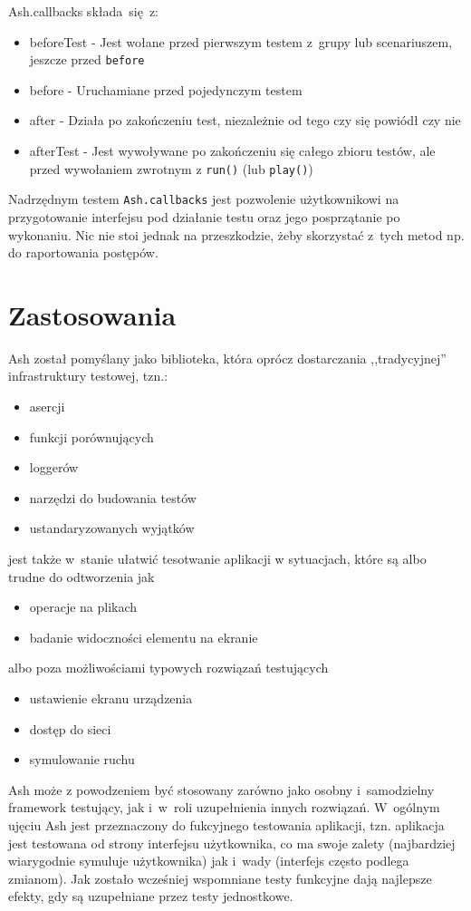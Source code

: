 \documentclass[brudnopis]{xmgr}
\begin{document}
Ash.callbacks składa~się~z:

\begin{itemize}
  \item beforeTest - Jest wołane przed pierwszym testem z~grupy lub scenariuszem, jeszcze przed \texttt{before}
  \item before - Uruchamiane przed pojedynczym testem
  \item after - Działa po zakończeniu test, niezależnie od tego czy się powiódł czy nie
  \item afterTest - Jest wywoływane po zakończeniu się całego zbioru testów, ale przed wywołaniem zwrotnym z \texttt{run()} (lub \texttt{play()}) 
\end{itemize}

Nadrzędnym testem \texttt{Ash.callbacks} jest pozwolenie użytkownikowi na przygotowanie interfejsu pod działanie testu oraz jego posprzątanie po wykonaniu. Nic nie stoi jednak na przeszkodzie, żeby skorzystać z~tych metod np. do raportowania postępów.

\chapter{Zastosowania}
Ash został pomyślany jako biblioteka, która oprócz dostarczania ,,tradycyjnej'' infrastruktury testowej, tzn.:
\begin{itemize}
  \item asercji
  \item funkcji porównujących
  \item loggerów
  \item narzędzi do budowania testów
  \item ustandaryzowanych wyjątków
\end{itemize}
jest także w~stanie ułatwić tesotwanie aplikacji w sytuacjach, które są albo trudne do odtworzenia jak
\begin{itemize}
  \item operacje na plikach
  \item badanie widoczności elementu na ekranie
\end{itemize}
 albo poza możliwościami typowych rozwiązań testujących
\begin{itemize}
  \item ustawienie ekranu urządzenia
  \item dostęp do sieci
  \item symulowanie ruchu
\end{itemize}

Ash może z powodzeniem być stosowany zarówno jako osobny i~samodzielny framework testujący, jak i~w~roli uzupełnienia innych rozwiązań. W~ogólnym ujęciu Ash jest przeznaczony do fukcyjnego testowania aplikacji, tzn. aplikacja jest testowana od strony interfejsu użytkownika, co ma swoje zalety (najbardziej wiarygodnie symuluje użytkownika) jak i~wady (interfejs często podlega zmianom). Jak zostało wcześniej wspomniane testy funkcyjne dają najlepsze efekty, gdy są uzupełniane przez testy jednostkowe.  
\end{document}
